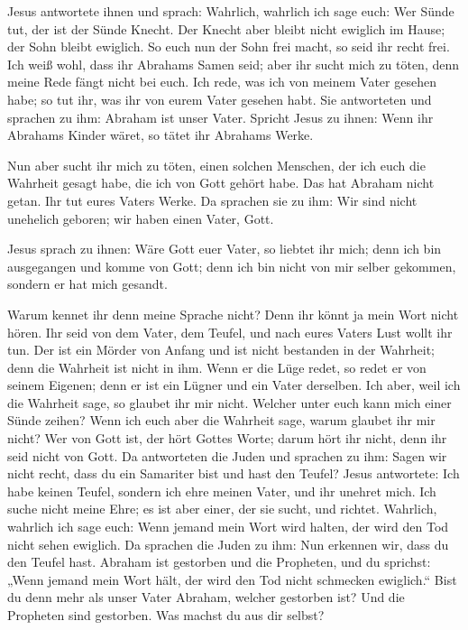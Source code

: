  Jesus antwortete ihnen und sprach: Wahrlich, wahrlich
ich sage euch: Wer Sünde tut, der ist der Sünde Knecht. 
Der Knecht aber bleibt nicht ewiglich im Hause; der Sohn bleibt
ewiglich.  So euch nun der Sohn frei macht, so seid ihr
recht frei.  Ich weiß wohl, dass ihr Abrahams Samen seid;
aber ihr sucht mich zu töten, denn meine Rede fängt nicht bei euch.
 Ich rede, was ich von meinem Vater gesehen habe; so tut
ihr, was ihr von eurem Vater gesehen habt.  Sie
antworteten und sprachen zu ihm: Abraham ist unser Vater. Spricht Jesus
zu ihnen: Wenn ihr Abrahams Kinder wäret, so tätet ihr Abrahams Werke.

 Nun aber sucht ihr mich zu töten, einen solchen
Menschen, der ich euch die Wahrheit gesagt habe, die ich von Gott gehört
habe. Das hat Abraham nicht getan.  Ihr tut eures Vaters
Werke. Da sprachen sie zu ihm: Wir sind nicht unehelich geboren; wir
haben einen Vater, Gott.

 Jesus sprach zu ihnen: Wäre Gott euer Vater, so liebtet
ihr mich; denn ich bin ausgegangen und komme von Gott; denn ich bin
nicht von mir selber gekommen, sondern er hat mich gesandt.

 Warum kennet ihr denn meine Sprache nicht? Denn ihr
könnt ja mein Wort nicht hören.  Ihr seid von dem Vater,
dem Teufel, und nach eures Vaters Lust wollt ihr tun. Der ist ein Mörder
von Anfang und ist nicht bestanden in der Wahrheit; denn die Wahrheit
ist nicht in ihm. Wenn er die Lüge redet, so redet er von seinem
Eigenen; denn er ist ein Lügner und ein Vater derselben. 
Ich aber, weil ich die Wahrheit sage, so glaubet ihr mir nicht.
 Welcher unter euch kann mich einer Sünde zeihen? Wenn
ich euch aber die Wahrheit sage, warum glaubet ihr mir nicht?
 Wer von Gott ist, der hört Gottes Worte; darum hört ihr
nicht, denn ihr seid nicht von Gott.  Da antworteten die
Juden und sprachen zu ihm: Sagen wir nicht recht, dass du ein Samariter
bist und hast den Teufel?  Jesus antwortete: Ich habe
keinen Teufel, sondern ich ehre meinen Vater, und ihr unehret mich.
 Ich suche nicht meine Ehre; es ist aber einer, der sie
sucht, und richtet.  Wahrlich, wahrlich ich sage euch:
Wenn jemand mein Wort wird halten, der wird den Tod nicht sehen
ewiglich.  Da sprachen die Juden zu ihm: Nun erkennen
wir, dass du den Teufel hast. Abraham ist gestorben und die Propheten,
und du sprichst: „Wenn jemand mein Wort hält, der wird den Tod nicht
schmecken ewiglich.``  Bist du denn mehr als unser Vater
Abraham, welcher gestorben ist? Und die Propheten sind gestorben. Was
machst du aus dir selbst?

